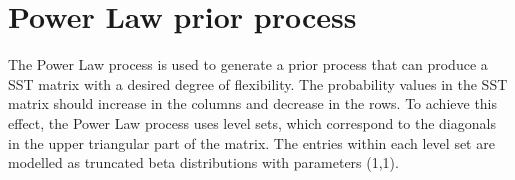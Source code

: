 \documentclass[11pt]{amsart}
\begin{document}
\begin{comment}
\begin{figure}[htbp]
    \centering
    \begin{minipage}{.5\textwidth}
        \centering
\texttt{[image: /Users/lapo\_santi/Desktop/Nial/project/POMMs/Stick-Breaking prior/Differentcvalues.png]}
\caption{The plot shows the evolution of the $\beta^0$ prior process for different $c$ values and $\beta^0_{\max} = 0.9 $. Every line corresponds to a different concentration parameter $c$, as shown in the legend.}
\label{fig:cvalues}
\end{minipage}\hfill
    \begin{minipage}{.5\textwidth}
        \centering
\texttt{[image: /Users/lapo\_santi/Desktop/Nial/project/POMMs/Stick-Breaking prior/differentbetavalues.png]}
\caption{The plot shows the evolution of different $\beta^0$ prior processes. Every line corresponds to a different $\beta_{max}$ value, given a concentration parameter $c = 3$. }
\label{fig:differentbetavalues}
\end{minipage}
\hfill
    \begin{minipage}{\textwidth}
        \centering
\texttt{[image: /Users/lapo\_santi/Desktop/Nial/project/POMMs/Stick-Breaking prior/Heatmap\_pomm.png]}
\caption{The plot shows a POMM matrix generated with parameters $K=10,c=3,\beta_{max} = 0.8$. The higher value is 0.79, which means that we are able to enforce the truncation as wanted. The parameter $c=3$ translates into a moderately concentrated matrix, where we do not have big differences in players' winning probability}
\label{fig:POMMpriormatrix}
\end{minipage}
 \end{figure}




\end{comment}





\newpage

\section{Power Law prior process}

The Power Law process is used to generate a prior process that can produce a SST matrix with a desired degree of flexibility. The probability values in the SST matrix should increase in the columns and decrease in the rows. To achieve this effect, the Power Law process uses level sets, which correspond to the diagonals in the upper triangular part of the matrix. The entries within each level set are modelled as truncated beta distributions with parameters (1,1).
\end{document}

